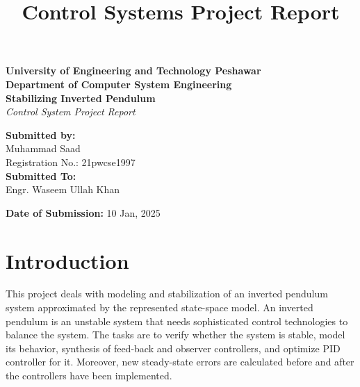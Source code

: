 \documentclass[a4paper,12pt]{article}
\begin{document}
\begin{titlepage}
    \centering
    
    \vspace{1cm}
    
    {\large \textbf{University of Engineering and Technology Peshawar}} \\[0.5cm]
    {\large \textbf{Department of Computer System Engineering}} \\[1.5cm]

    {\Huge \textbf{Stabilizing Inverted Pendulum}} \\[1cm]
    {\large \textit{Control System Project Report}} \\[3cm]

    \begin{flushleft}
        \textbf{Submitted by:} \\[0.2cm]
        Muhammad Saad \\ 
        Registration No.: 21pwcse1997 \\[1cm]

        \textbf{Submitted To:} \\[0.2cm]
        Engr. Waseem Ullah Khan \\[3cm]
    \end{flushleft}

    \vfill

    \textbf{Date of Submission:} 10 Jan, 2025 \\[1cm]
\end{titlepage}

\title{Control Systems Project Report}
\author{}
\date{}
\maketitle

\section*{Introduction}
This project deals with modeling and stabilization of an inverted pendulum system approximated by the represented state-space model. An inverted pendulum is an unstable system that needs sophisticated control technologies to balance the system. The tasks are to verify whether the system is stable, model its behavior, synthesis of feed-back and observer controllers, and optimize PID controller for it. Moreover, new steady-state errors are calculated before and after the controllers have been implemented.
\end{document}
